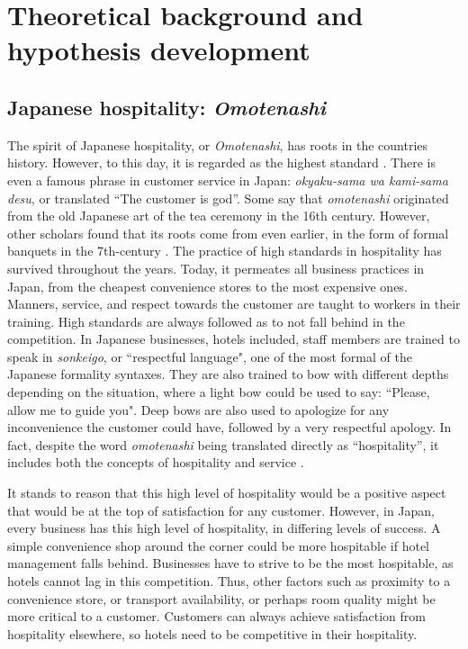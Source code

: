 \documentclass[smallextended,natbib]{svjour3}       %
\begin{document}
\section{Theoretical background and hypothesis development}\label{theory_hypothesis}

  \subsection{Japanese hospitality: \textit{Omotenashi}}\label{theory_omotenashi}

    The spirit of Japanese hospitality, or \textit{Omotenashi}, has roots in the countries history. However, to this day, it is regarded as the highest standard \cite[][]{ikeda2013omotenashi, al2015characteristics}. There is even a famous phrase in customer service in Japan: \textit{okyaku-sama wa kami-sama desu}, or translated ``The customer is god''. Some say that \textit{omotenashi} originated from the old Japanese art of the tea ceremony in the 16th century. However, other scholars found that its roots come from even earlier, in the form of formal banquets in the 7th-century \cite[][]{aishima2015origin}. The practice of high standards in hospitality has survived throughout the years. Today, it permeates all business practices in Japan, from the cheapest convenience stores to the most expensive ones. Manners, service, and respect towards the customer are taught to workers in their training. High standards are always followed as to not fall behind in the competition. In Japanese businesses, hotels included, staff members are trained to speak in \textit{sonkeigo}, or ``respectful language", one of the most formal of the Japanese formality syntaxes. They are also trained to bow with different depths depending on the situation, where a light bow could be used to say: ``Please, allow me to guide you". Deep bows are also used to apologize for any inconvenience the customer could have, followed by a very respectful apology. In fact, despite the word \textit{omotenashi} being translated directly as ``hospitality'', it includes both the concepts of hospitality and service \cite[][]{Kuboyama2020}. 

    It stands to reason that this high level of hospitality would be a positive aspect that would be at the top of satisfaction for any customer. However, in Japan, every business has this high level of hospitality, in differing levels of success. A simple convenience shop around the corner could be more hospitable if hotel management falls behind. Businesses have to strive to be the most hospitable, as hotels cannot lag in this competition. Thus, other factors such as proximity to a convenience store, or transport availability, or perhaps room quality might be more critical to a customer. Customers can always achieve satisfaction from hospitality elsewhere, so hotels need to be competitive in their hospitality. 
\end{document}
